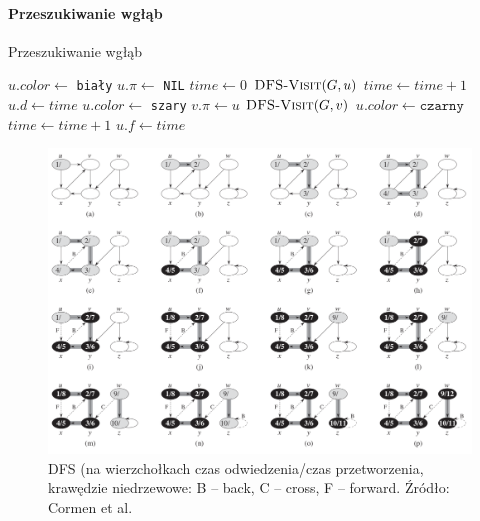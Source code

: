 \documentclass[10pt, oneside]{article}
\theoremstyle{remark}
\newcommand{\algcost}[2]{\strut\hfill\makebox[1.5cm][l]{#1}\makebox[4cm][l]{#2}}
\begin{document}
\paragraph{Przeszukiwanie wgłąb}

\begin{algorithm}
    \caption{Przeszukiwanie wgłąb}
    \label{alg:dfs}
    \begin{algorithmic}[1] %
         \algcost{}{//$O(|V|+|E|)$}
            		\State $u.color \gets$ \texttt{biały}
            		\State $u.\pi \gets$ \texttt{NIL} 
            	\EndFor
            	\State $time \gets 0$
            			\State $\Call{DFS-Visit}{G, u}$
            		\EndIf
            	\EndFor
        \EndFunction
        		\State $time \gets time + 1$
        		\State $u.d \gets time$
            	\State $u.color \gets$ \texttt{szary}
        				\State $v.\pi \gets u$
        				\State $\Call{DFS-Visit}{G, v}$
        			\EndIf         
            	\EndFor
            	\State $u.color \gets \texttt{czarny}$
            	\State $time \gets time + 1$
            	\State $u.f \gets time$
        \EndFunction
    \end{algorithmic}
\end{algorithm}

\begin{figure}[htpb]
	\centering
	\includegraphics[width=.9\textwidth]{figures/dfs}
	\caption{DFS (na wierzchołkach czas odwiedzenia/czas przetworzenia, krawędzie niedrzewowe: B -- back, C -- cross, F -- forward. Źródło: Cormen et al.}
\end{figure}
\end{document}
